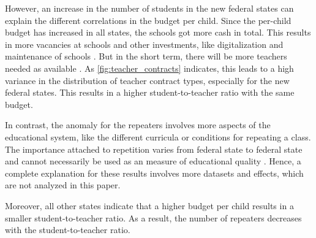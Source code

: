 However,  an increase in the number of students in the new federal states can explain the different correlations in the budget per child. Since the per-child budget has increased in all states, the schools got more cash in total. This results in more vacancies at schools \cite{kultusminister_konferenz_lehrkrafteeinstellungsbedarf_2023} and other investments, like digitalization and maintenance of schools \cite{bundesministerium_fur_bildung_und_forschung_fortschrittsbericht_2022}. But in the short term, there will be more teachers needed as available \cite{kultusminister_konferenz_lehrkrafteeinstellungsbedarf_2023}. As \autoref{fig:teacher_contracts} indicates, this leads to a high variance in the distribution of teacher contract types, especially for the new federal states. This results in a higher student-to-teacher ratio with the same budget.

In contrast, the anomaly for the repeaters involves more aspects of the educational system, like the different curricula or conditions for repeating a class. The importance attached to repetition varies from federal state to federal state and cannot necessarily be used as an measure of educational quality \cite{klemm_klassenwiederholungen_2009}. Hence, a complete explanation for these results involves more datasets and effects, which are not analyzed in this paper.

Moreover, all other states indicate that a higher budget per child results in a smaller student-to-teacher ratio. As a result, the number of repeaters decreases with the student-to-teacher ratio.